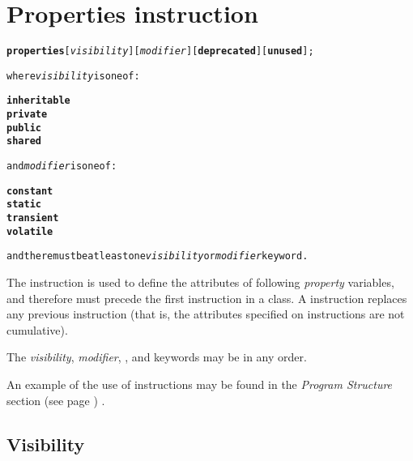 \chapter{Properties instruction}\label{refprop}
\begin{shaded}
\begin{alltt}
\textbf{properties} [\emph{visibility}] [\emph{modifier}] [\textbf{deprecated}] [\textbf{unused}];

where \emph{visibility} is one of:

    \textbf{inheritable}
    \textbf{private}
    \textbf{public}
    \textbf{shared}

and \emph{modifier} is one of:

    \textbf{constant}
    \textbf{static}
    \textbf{transient}
    \textbf{volatile}

and there must be at least one \emph{visibility} or \emph{modifier} keyword.
\end{alltt}
\end{shaded}
 
The  instruction is used to define the attributes
of following \emph{property} variables, and therefore must precede the
first  instruction in a class.
A  instruction replaces any previous
 instruction (that is, the attributes specified on
 instructions are not cumulative).
 
The \emph{visibility}, \emph{modifier},
, and  keywords may be in any
order.
 
An example of the use of  instructions may be
found in the  \emph{Program Structure} section (see page \pageref{refpstruct}) .
\section{Visibility}
 

